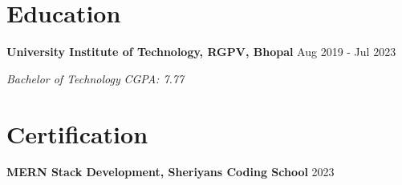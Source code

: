 \documentclass[a4paper,10pt]{article}
\newcommand{\company}[2]{\textbf{#1} \hfill #2\par}
\newcommand{\position}[2]{\textit{#1} \hfill \textit{#2}\par\vspace{1pt}}
\begin{document}
\section{Education}
\company{University Institute of Technology, RGPV, Bhopal}{Aug 2019 - Jul 2023}
\position{Bachelor of Technology}{CGPA: 7.77}

\section{Certification}
\company{MERN Stack Development, Sheriyans Coding School}{2023}
\end{document}
